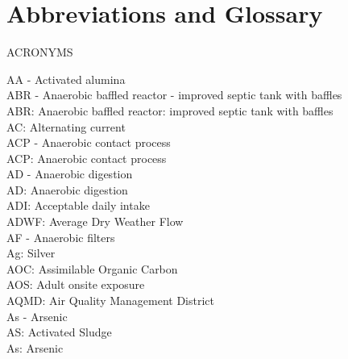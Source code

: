 \chapter{Abbreviations and Glossary}
\begin{center}
\Huge{ACRONYMS}
\end{center}
\vfill

AA - Activated alumina
\vspace{0.3cm}\\
ABR - Anaerobic baffled reactor - improved septic tank with baffles
\vspace{0.3cm}\\
ABR:  Anaerobic baffled reactor:  improved septic tank with baffles
\vspace{0.3cm}\\
AC:  Alternating current
\vspace{0.3cm}\\
ACP - Anaerobic contact process
\vspace{0.3cm}\\
ACP:  Anaerobic contact process
\vspace{0.3cm}\\
AD - Anaerobic digestion
\vspace{0.3cm}\\
AD:  Anaerobic digestion
\vspace{0.3cm}\\
ADI:  Acceptable daily intake
\vspace{0.3cm}\\
ADWF:  Average Dry Weather Flow
\vspace{0.3cm}\\
AF - Anaerobic filters
\vspace{0.3cm}\\
Ag:  Silver
\vspace{0.3cm}\\
AOC:  Assimilable Organic Carbon
\vspace{0.3cm}\\
AOS:  Adult onsite exposure
\vspace{0.3cm}\\
AQMD:  Air Quality Management District
\vspace{0.3cm}\\
As - Arsenic
\vspace{0.3cm}\\
AS:  Activated Sludge
\vspace{0.3cm}\\
As:  Arsenic
\vspace{0.3cm}\\
